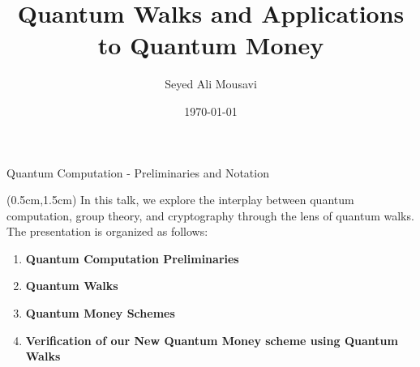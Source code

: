 \documentclass{beamer}
\title{Quantum Walks and Applications to Quantum Money}
\author{Seyed Ali Mousavi}
\institute{Supervised by Dr. Jake Doliskani}
\date{\today}
\theoremstyle{definition}
\begin{document}
\begin{frame}
    \titlepage
\end{frame}





\begin{frame}{Quantum Computation - Preliminaries and Notation}
    
    \begin{textblock*}{12cm}(0.5cm,1.5cm)
        In this talk, we explore the interplay between quantum computation, group theory, and cryptography through the lens of quantum walks. The presentation is organized as follows:
        
        \vspace{0.5cm}
        \begin{enumerate}
            \item \textbf{Quantum Computation Preliminaries} \\
            \vspace{0.1cm}
            
            \item \textbf{Quantum Walks} \\
            \vspace{0.1cm}
         
            \item \textbf{Quantum Money Schemes} \\
            \vspace{0.1cm}
            \item \textbf{Verification of our New Quantum Money scheme using Quantum Walks} \\
          
        \end{enumerate}
            
    \end{textblock*}
\end{frame}
\end{document}
